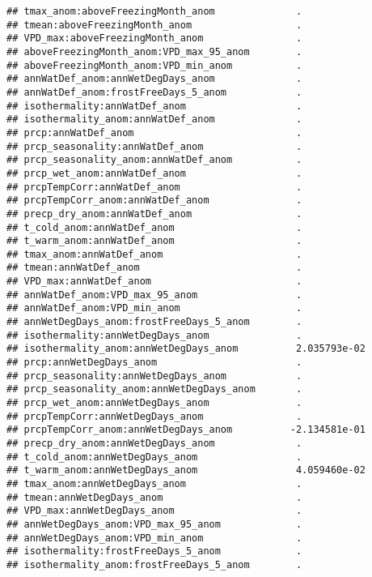 \documentclass[
]{article}
\begin{document}
\begin{verbatim}
## tmax_anom:aboveFreezingMonth_anom              .           
## tmean:aboveFreezingMonth_anom                  .           
## VPD_max:aboveFreezingMonth_anom                .           
## aboveFreezingMonth_anom:VPD_max_95_anom        .           
## aboveFreezingMonth_anom:VPD_min_anom           .           
## annWatDef_anom:annWetDegDays_anom              .           
## annWatDef_anom:frostFreeDays_5_anom            .           
## isothermality:annWatDef_anom                   .           
## isothermality_anom:annWatDef_anom              .           
## prcp:annWatDef_anom                            .           
## prcp_seasonality:annWatDef_anom                .           
## prcp_seasonality_anom:annWatDef_anom           .           
## prcp_wet_anom:annWatDef_anom                   .           
## prcpTempCorr:annWatDef_anom                    .           
## prcpTempCorr_anom:annWatDef_anom               .           
## precp_dry_anom:annWatDef_anom                  .           
## t_cold_anom:annWatDef_anom                     .           
## t_warm_anom:annWatDef_anom                     .           
## tmax_anom:annWatDef_anom                       .           
## tmean:annWatDef_anom                           .           
## VPD_max:annWatDef_anom                         .           
## annWatDef_anom:VPD_max_95_anom                 .           
## annWatDef_anom:VPD_min_anom                    .           
## annWetDegDays_anom:frostFreeDays_5_anom        .           
## isothermality:annWetDegDays_anom               .           
## isothermality_anom:annWetDegDays_anom          2.035793e-02
## prcp:annWetDegDays_anom                        .           
## prcp_seasonality:annWetDegDays_anom            .           
## prcp_seasonality_anom:annWetDegDays_anom       .           
## prcp_wet_anom:annWetDegDays_anom               .           
## prcpTempCorr:annWetDegDays_anom                .           
## prcpTempCorr_anom:annWetDegDays_anom          -2.134581e-01
## precp_dry_anom:annWetDegDays_anom              .           
## t_cold_anom:annWetDegDays_anom                 .           
## t_warm_anom:annWetDegDays_anom                 4.059460e-02
## tmax_anom:annWetDegDays_anom                   .           
## tmean:annWetDegDays_anom                       .           
## VPD_max:annWetDegDays_anom                     .           
## annWetDegDays_anom:VPD_max_95_anom             .           
## annWetDegDays_anom:VPD_min_anom                .           
## isothermality:frostFreeDays_5_anom             .           
## isothermality_anom:frostFreeDays_5_anom        .           

\end{verbatim}
\end{document}
